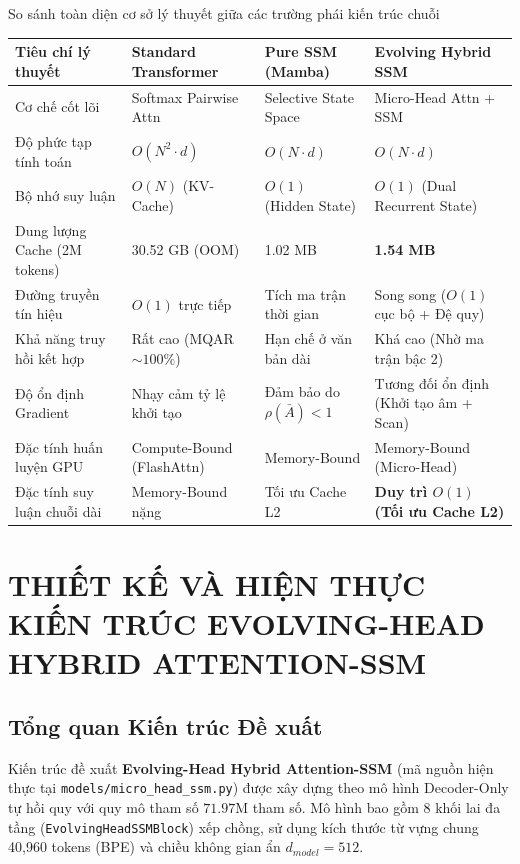 \documentclass{uetgraduation}
\begin{document}
\begin{table}{So sánh toàn diện cơ sở lý thuyết giữa các trường phái kiến trúc chuỗi}
\centering
\small
\setlength{\tabcolsep}{3pt}
\renewcommand{\arraystretch}{1.2}
\begin{tabular}{p{}p{}p{}p{}}
\hline
\textbf{Tiêu chí lý thuyết} & \textbf{Standard Transformer} & \textbf{Pure SSM (Mamba)} & \textbf{Evolving Hybrid SSM} \\ \hline
Cơ chế cốt lõi & Softmax Pairwise Attn & Selective State Space & Micro-Head Attn + SSM \\
Độ phức tạp tính toán & $O(N^2 \cdot d)$ & $O(N \cdot d)$ & $O(N \cdot d)$ \\
Bộ nhớ suy luận & $O(N)$ (KV-Cache) & $O(1)$ (Hidden State) & $O(1)$ (Dual Recurrent State) \\
Dung lượng Cache (2M tokens) & 30.52 GB (OOM) & 1.02 MB & \textbf{1.54 MB} \\
Đường truyền tín hiệu & $O(1)$ trực tiếp & Tích ma trận thời gian & Song song ($O(1)$ cục bộ + Đệ quy) \\
Khả năng truy hồi kết hợp & Rất cao (MQAR $\sim 100\%$) & Hạn chế ở văn bản dài & Khá cao (Nhờ ma trận bậc 2) \\
Độ ổn định Gradient & Nhạy cảm tỷ lệ khởi tạo & Đảm bảo do $\rho(\bar{A}) < 1$ & Tương đối ổn định (Khởi tạo âm + Scan) \\
Đặc tính huấn luyện GPU & Compute-Bound (FlashAttn) & Memory-Bound & Memory-Bound (Micro-Head) \\
Đặc tính suy luận chuỗi dài & Memory-Bound nặng & Tối ưu Cache L2 & \textbf{Duy trì $O(1)$ (Tối ưu Cache L2)} \\ \hline
\end{tabular}
\end{table}

\chapter{THIẾT KẾ VÀ HIỆN THỰC KIẾN TRÚC EVOLVING-HEAD HYBRID ATTENTION-SSM}
\section{Tổng quan Kiến trúc Đề xuất}
Kiến trúc đề xuất \textbf{Evolving-Head Hybrid Attention-SSM} (mã nguồn hiện thực tại \texttt{models/micro\_head\_ssm.py}) được xây dựng theo mô hình Decoder-Only tự hồi quy với quy mô tham số $71.97\text{M}$ tham số. Mô hình bao gồm 8 khối lai đa tầng (\texttt{EvolvingHeadSSMBlock}) xếp chồng, sử dụng kích thước từ vựng chung 40,960 tokens (BPE) và chiều không gian ẩn $d_{model}=512$.
\end{document}
